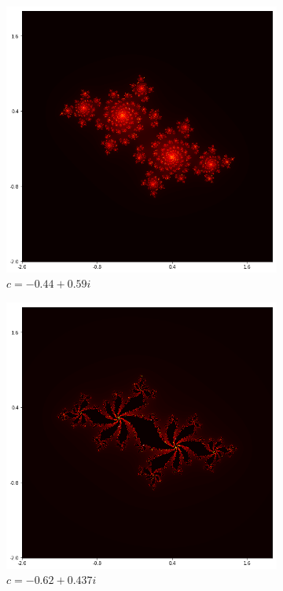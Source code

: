 \documentclass{amsart}
\theoremstyle{definition}
\theoremstyle{remark}
\numberwithin{equation}{section}
\begin{document}
\begin{figure}[h]
\begin{subfigure}{.32\textwidth}
  \includegraphics[width=.8\linewidth]{JuliaC3.png}
  \caption{$c=-0.44+0.59i$}
\end{subfigure}
\begin{subfigure}{.32\textwidth}
  \centering
  \includegraphics[width=.8\linewidth]{JuliaC4.png}
  \caption{$c=-0.62+0.437i$}
\end{subfigure}
\begin{subfigure}{.32\textwidth}
  \centering

\end{subfigure}
\end{figure}
\end{document}
